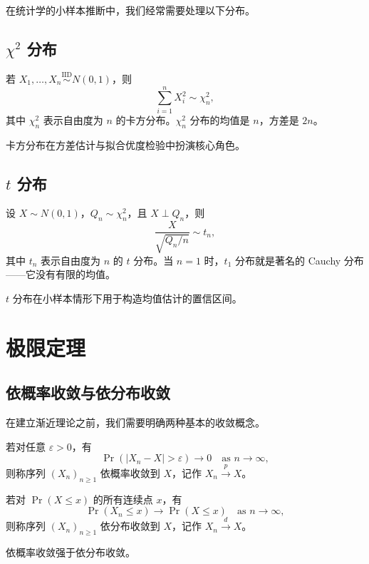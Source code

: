 在统计学的小样本推断中，我们经常需要处理以下分布。

\subsection{$\chi^2$ 分布}

若 $X_1, \ldots, X_n \stackrel{\text{IID}}{\sim} N(0, 1)$，则
\[
\sum_{i=1}^n X_i^2 \sim \chi_n^2 ,
\]
其中 $\chi_n^2$ 表示自由度为 $n$ 的卡方分布。$\chi_n^2$ 分布的均值是 $n$，方差是 $2n$。

卡方分布在方差估计与拟合优度检验中扮演核心角色。

\subsection{$t$ 分布}

设 $X \sim N(0, 1)$，$Q_n \sim \chi_n^2$，且 $X \perp Q_n$，则
\[
\frac{X}{\sqrt{Q_n / n}} \sim t_n ,
\]
其中 $t_n$ 表示自由度为 $n$ 的 $t$ 分布。当 $n=1$ 时，$t_1$ 分布就是著名的 Cauchy 分布——它没有有限的均值。

$t$ 分布在小样本情形下用于构造均值估计的置信区间。

\section{极限定理}

\subsection{依概率收敛与依分布收敛}

在建立渐近理论之前，我们需要明确两种基本的收敛概念。

\begin{Definition}[依概率收敛]\label{def:convergence-probability}
若对任意 $\varepsilon > 0$，有
\[
\Pr(|X_n - X| > \varepsilon) \rightarrow 0 \quad \text{as } n \to \infty,
\]
则称序列 $(X_n)_{n \geq 1}$ 依概率收敛到 $X$，记作 $X_n \xrightarrow{p} X$。
\end{Definition}

\begin{Definition}[依分布收敛]\label{def:convergence-distribution}
若对 $\Pr(X \leq x)$ 的所有连续点 $x$，有
\[
\Pr(X_n \leq x) \rightarrow \Pr(X \leq x) \quad \text{as } n \to \infty,
\]
则称序列 $(X_n)_{n \geq 1}$ 依分布收敛到 $X$，记作 $X_n \xrightarrow{d} X$。
\end{Definition}

依概率收敛强于依分布收敛。

